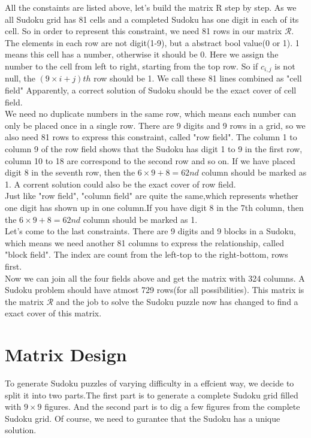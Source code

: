 \documentclass{mcmthesis}
\begin{document}
\indent All the constaints are listed above, let's build the matrix R step by step. As we all Sudoku grid has 81 cells and a completed Sudoku has one digit in each of its cell. So in order to represent this constraint, we need 81 rows in our matrix $\mathcal{R}$. The elements in each row are not digit(1-9), but a abstract bool value(0 or 1). 1 means this cell has a number, otherwise it should be 0. Here we assign the number to the cell from left to right, starting from the top row. So if $\textit{c}_{i,j}$ is not null, the $(9\times i + j)th$ row should be 1. We call these 81 lines combined as "cell field" Apparently, a correct solution of Sudoku should be the exact cover of cell field.\\
\indent We need no duplicate numbers in the same row, which means each number can only be placed once in a single row. There are 9 digits and 9 rows in a grid, so we also need 81 rows to express this constraint, called "row field". The column 1 to column 9 of the row field shows that the Sudoku has digit 1 to 9 in the first row, column 10 to 18 are correspond to the second row and so on. If we have placed digit 8 in the seventh row, then the $6\times9+8=62nd$ column should be marked as 1. A corrent solution could also be the exact cover of row field.\\
\indent Just like "row field", "column field" are quite the same,which represents whether one digit has shown up in one column.If you have digit 8 in the 7th column, then the  $6\times9+8=62nd$ column should be marked as 1.\\
\indent Let's come to the last constraints. There are 9 digits and 9 blocks in a Sudoku, which means we need another 81 columns to express the relationship, called "block field". The index are count from the left-top to the right-bottom, rows first. \\
\indent Now we can join all the four fields above and get the matrix with 324 columns. A Sudoku problem should have atmost 729 rows(for all possibilities). This matrix is the matrix $\mathcal{R}$ and the job to solve the Sudoku puzzle now has changed to find a exact cover of this matrix. \newline 
\section{Matrix Design}
\indent To generate Sudoku puzzles of varying difficulty in a effcient way, we decide to split it into two parts.The first part is to generate a complete Sudoku grid filled with $9\times9$ figures. And the second part is to dig a few figures from the complete Sudoku grid. Of course, we need to gurantee that the Sudoku has a unique solution.\\
\end{document}
